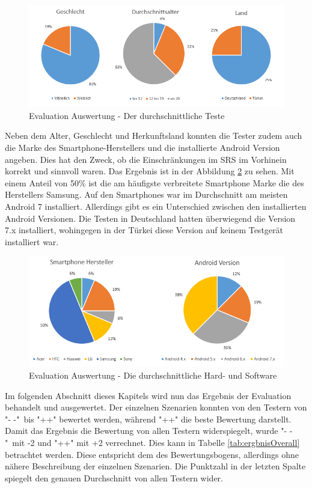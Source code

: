 			\begin{figure}[htbp]
				\centering 
				\label{auswertungTester}
				\includegraphics[width=\textwidth]{pics/TesterAuswertung.png}
				\caption{Evaluation Auswertung - Der durchschnittliche Teste}
			\end{figure}
			
			Neben dem Alter, Geschlecht und Herkunftsland konnten die Tester zudem auch die Marke des Smartphone-Herstellers und die installierte Android Version angeben. Dies hat den Zweck, ob die Einschränkungen im SRS im Vorhinein korrekt und sinnvoll waren. Das Ergebnis ist in der Abbildung \ref{auswertungSmartphones} zu sehen. Mit einem Anteil von 50\% ist die am häufigste verbreitete Smartphone Marke die des Herstellers Samsung. Auf den Smartphones war im Durchschnitt am meisten Android 7 installiert. Allerdings gibt es ein Unterschied zwischen den installierten Android Versionen. Die Testen in Deutschland hatten überwiegend die Version 7.x installiert, wohingegen in der Türkei diese Version auf keinem Testgerät installiert war.
			
			\begin{figure}[htbp]
				\centering 
				\label{auswertungSmartphones}
				\includegraphics[width=\textwidth]{pics/SmartphoneAuswertung.png}
				\caption{Evaluation Auswertung - Die durchschnittliche Hard- und Software}
			\end{figure}
		
			Im folgenden Abschnitt dieses Kapitels wird nun das Ergebnis der Evaluation behandelt und ausgewertet. Der einzelnen Szenarien konnten von den Testern von "\-- -"\ bis "++" bewertet werden, während "++" die beste Bewertung darstellt. Damit das Ergebnis die Bewertung von allen Testern widerspiegelt, wurde "\-- -"\ mit -2 und "++" mit +2 verrechnet. Dies kann in Tabelle \ref{tab:ergbnisOverall} betrachtet werden. Diese entspricht dem des Bewertungsbogens, allerdings ohne nähere Beschreibung der einzelnen Szenarien. Die Punktzahl in der letzten Spalte spiegelt den genauen Durchschnitt von allen Testern wider.
			
